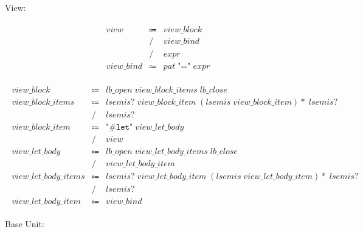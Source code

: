 View:

\begin{align*}
    \begin{array}{rcll}
        \mathit{view}
        &\Coloneq &\mathit{view\_block} \\
        &\mathrel{/} &\mathit{view\_bind} \\
        &\mathrel{/} &\mathit{expr} \\
        \mathit{view\_bind}
        &\Coloneq &\mathit{pat}\; \texttt{"="}\; \mathit{expr}
    \end{array}
\end{align*}

\begin{align*}
    \begin{array}{rcll}
        \mathit{view\_block}
        &\Coloneq &\mathit{lb\_open}\; \mathit{view\_block\_items}\; \mathit{lb\_close} \\
        \mathit{view\_block\_items}
        &\Coloneq &\mathit{lsemis}{?}\; \mathit{view\_block\_item}\; (\mathit{lsemis}\; \mathit{view\_block\_item}){*}\; \mathit{lsemis}{?} \\
        &\mathrel{/} &\mathit{lsemis}{?} \\
        \mathit{view\_block\_item}
        &\Coloneq &\texttt{"\#let"}\; \mathit{view\_let\_body} \\
        &\mathrel{/} &\mathit{view} \\
        \mathit{view\_let\_body}
        &\Coloneq &\mathit{lb\_open}\; \mathit{view\_let\_body\_items}\; \mathit{lb\_close} \\
        &\mathrel{/} &\mathit{view\_let\_body\_item} \\
        \mathit{view\_let\_body\_items}
        &\Coloneq &\mathit{lsemis}{?}\; \mathit{view\_let\_body\_item}\; (\mathit{lsemis}\; \mathit{view\_let\_body\_item}){*}\; \mathit{lsemis}{?} \\
        &\mathrel{/} &\mathit{lsemis}{?} \\
        \mathit{view\_let\_body\_item}
        &\Coloneq &\mathit{view\_bind}
    \end{array}
\end{align*}

Base Unit:

